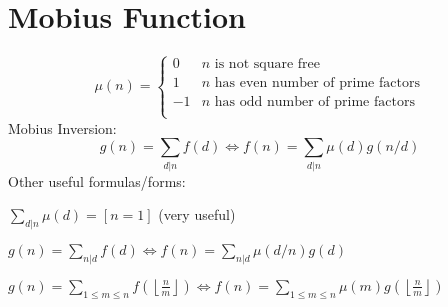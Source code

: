 \section{Mobius Function}
\[
	\mu(n) = \begin{cases} 0 & n \textrm{ is not square free}\\ 1 & n \textrm{ has even number of prime factors}\\ -1 & n \textrm{ has odd number of prime factors}\\\end{cases}
\]
  Mobius Inversion:
  \[ g(n) = \sum_{d|n} f(d) \Leftrightarrow f(n) = \sum_{d|n} \mu(d)g(n/d) \]
  Other useful formulas/forms:

  $ \sum_{d | n} \mu(d) = [ n = 1] $ (very useful)

  $ g(n) = \sum_{n|d} f(d) \Leftrightarrow f(n) = \sum_{n|d} \mu(d/n)g(d)$

 $ g(n) = \sum_{1 \leq m \leq n} f(\left\lfloor\frac{n}{m}\right \rfloor ) \Leftrightarrow f(n) = \sum_{1\leq m\leq n} \mu(m)g(\left\lfloor\frac{n}{m}\right\rfloor)$
